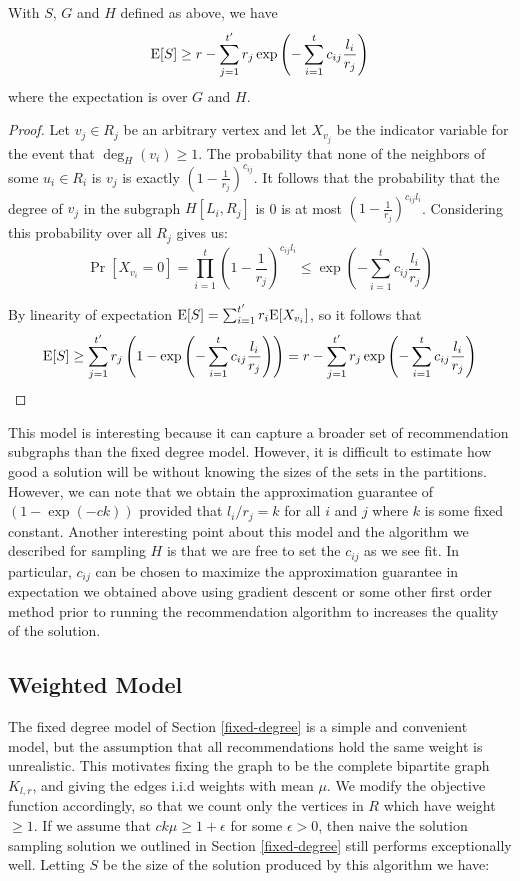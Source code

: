 \begin{thm}
With $S$, $G$ and $H$ defined as above, we have
\[ \text{E}[S] \geq r - \sum_{j=1}^{t'} r_j \exp\left(-\sum_{i=1}^t c_{ij} \frac{l_i}{r_j}\right)\]
where the expectation is over $G$ and $H$.
\end{thm}
\begin{proof}
Let $v_j \in R_j$ be an arbitrary vertex and let $X_{v_j}$ be the
indicator variable for the event that $\deg_H(v_i) \geq 1$. The
probability that none of the neighbors of some $u_i\in R_i$ is $v_j$
is exactly $(1-\frac{1}{r_j})^{c_{ij}}$. It follows that the
probability that the degree of $v_j$ in the subgraph $H[L_i,R_j]$ is 0
is at most $(1-\frac{1}{r_j})^{c_{ij}l_i}$. Considering this
probability over all $R_j$ gives us:
\[ \Pr[X_{v_i} = 0] = \prod_{i=1}^{t} \left(1-\frac{1}{r_j}\right)^{c_{ij} l_i} \leq \exp\left(-\sum_{i=1}^t c_{ij} \frac{l_i}{r_j}\right)\]

By linearity of expectation $\text{E}[S] = \sum_{i=1}^{t'} r_i \text{E}[X_{v_i}]$,
so it follows that
\[ \text{E}[S] \geq \sum_{j=1}^{t'} r_j \left(1-\exp\left(-\sum_{i=1}^t c_{ij} \frac{l_i}{r_j}\right)\right) = r - \sum_{j=1}^{t'} r_j \exp\left(-\sum_{i=1}^t c_{ij} \frac{l_i}{r_j}\right)\]
\end{proof}

This model is interesting because it can capture a broader set of
recommendation subgraphs than the fixed degree model. However, it is
difficult to estimate how good a solution will be without knowing
the sizes of the sets in the partitions. However, we can note that we
obtain the approximation guarantee of $(1-\exp(-ck))$ provided that
$l_i/r_j = k$ for all $i$ and $j$ where $k$ is some fixed
constant. Another interesting point about this model and the algorithm
we described for sampling $H$ is that we are free to set the $c_{ij}$
as we see fit. In particular, $c_{ij}$ can be chosen to maximize the
approximation guarantee in expectation we obtained above using
gradient descent or some other first order method prior to running the
recommendation algorithm to increases the quality of the solution.


\subsection{Weighted Model}
\label{weighted}
The fixed degree model of Section \ref{fixed-degree} is a simple and
convenient model, but the assumption that all recommendations hold the
same weight is unrealistic. This motivates fixing the graph to be the
complete bipartite graph $K_{l,r}$, and giving the edges i.i.d weights
with mean $\mu$. We modify the objective function accordingly, so that
we count only the vertices in $R$ which have weight $\geq 1$. If we
assume that $ck\mu \geq 1+\epsilon$ for some $\epsilon > 0$, then 
naive the solution sampling solution we outlined in Section \ref{fixed-degree}
still performs exceptionally well. Letting $S$ be the size of the 
solution produced by this algorithm we have:

